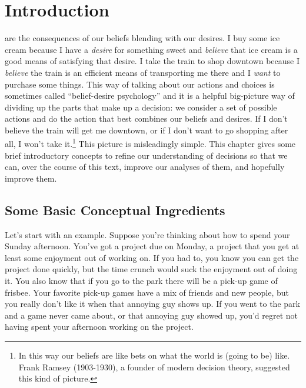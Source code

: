 \documentclass[]{tufte-book}
\begin{document}
\hypertarget{intro}{%
\chapter{Introduction}\label{intro}}

 are the consequences of our beliefs blending with our desires. I buy some ice cream because I have a \emph{desire} for something sweet and \emph{believe} that ice cream is a good means of satisfying that desire. I take the train to shop downtown because I \emph{believe }the train is an efficient means of transporting me there and I \emph{want} to purchase some things. This way of talking about our actions and choices is sometimes called ``belief-desire psychology'' and it is a helpful big-picture way of dividing up the parts that make up a decision: we consider a set of possible actions and do the action that best combines our beliefs and desires. If I don't believe the train will get me downtown, or if I don't want to go shopping after all, I won't take it.\footnote{In this way our beliefs are like bets on what the world is (going to be) like. Frank Ramsey (1903-1930), a founder of modern decision theory, suggested this kind of picture.} This picture is misleadingly simple. This chapter gives some brief introductory concepts to refine our understanding of decisions so that we can, over the course of this text, improve our analyses of them, and hopefully improve them.

\hypertarget{some-basic-conceptual-ingredients}{%
\section{Some Basic Conceptual Ingredients}\label{some-basic-conceptual-ingredients}}

Let's start with an example. Suppose you're thinking about how to spend your Sunday afternoon. You've got a project due on Monday, a project that you get at least some enjoyment out of working on. If you had to, you know you can get the project done quickly, but the time crunch would suck the enjoyment out of doing it. You also know that if you go to the park there will be a pick-up game of frisbee. Your favorite pick-up games have a mix of friends and new people, but you really don't like it when that annoying guy shows up. If you went to the park and a game never came about, or that annoying guy showed up, you'd regret not having spent your afternoon working on the project.
\end{document}
